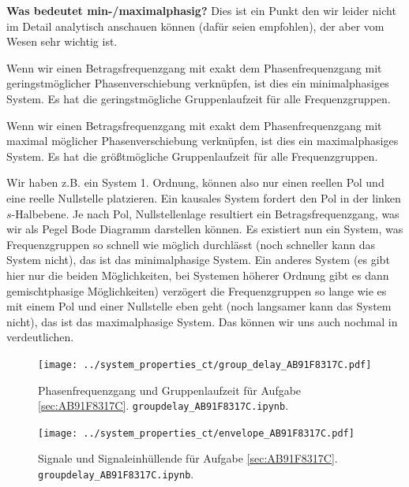 \begin{mdframed}
\textbf{Was bedeutet min-/maximalphasig?}
Dies ist ein Punkt den wir leider nicht im Detail analytisch anschauen können
(dafür seien \cite{LangeSigSys1, Fliege1991} empfohlen), der aber vom Wesen sehr
wichtig ist.

Wenn wir einen Betragsfrequenzgang mit exakt dem Phasenfrequenzgang
mit geringstmöglicher Phasenverschiebung verknüpfen, ist dies ein minimalphasiges
System. Es hat die geringstmögliche Gruppenlaufzeit für alle Frequenzgruppen.

Wenn wir einen Betragsfrequenzgang mit exakt dem Phasenfrequenzgang
mit maximal möglicher Phasenverschiebung verknüpfen, ist dies ein maximalphasiges
System. Es hat die größtmögliche Gruppenlaufzeit für alle Frequenzgruppen.

Wir haben z.B. ein System 1. Ordnung, können also nur einen reellen Pol und
eine reelle Nullstelle platzieren. Ein kausales System fordert den Pol in der linken
$s$-Halbebene. Je nach Pol, Nullstellenlage resultiert ein Betragsfrequenzgang,
was wir als Pegel Bode Diagramm darstellen können.
Es existiert nun ein System, was Frequenzgruppen so schnell wie möglich durchlässt
(noch schneller kann das System nicht), das ist das minimalphasige System.
Ein anderes System (es gibt hier nur die beiden Möglichkeiten, bei Systemen
höherer Ordnung gibt es dann gemischtphasige Möglichkeiten)
verzögert die Frequenzgruppen so lange wie es mit einem Pol und einer
Nullstelle eben geht (noch langsamer kann das System nicht), das ist das maximalphasige
System.
Das können wir uns auch nochmal in 
verdeutlichen.

\end{mdframed}


\begin{figure}[h]
\centering
\texttt{[image: ../system\_properties\_ct/group\_delay\_AB91F8317C.pdf]}
\caption{Phasenfrequenzgang und Gruppenlaufzeit für Aufgabe \ref{sec:AB91F8317C}.
\texttt{groupdelay\_AB91F8317C.ipynb}.}
\label{fig:group_delay_AB91F8317C}
\end{figure}
%
%
%
\begin{figure}[h]
\centering
\texttt{[image: ../system\_properties\_ct/envelope\_AB91F8317C.pdf]}
\caption{Signale und Signaleinhüllende für Aufgabe \ref{sec:AB91F8317C}.
\texttt{groupdelay\_AB91F8317C.ipynb}.}
\label{fig:envelope_AB91F8317C}
\end{figure}
